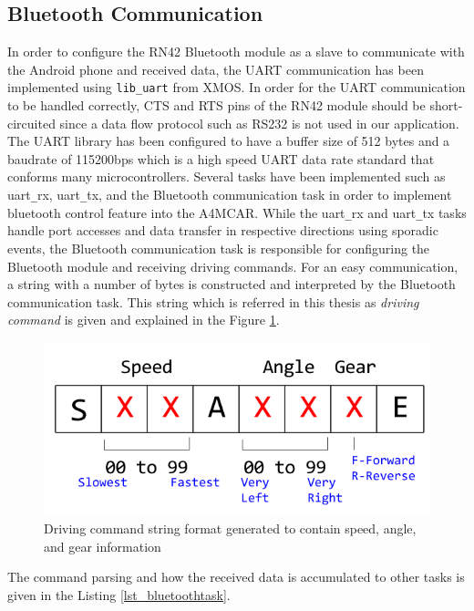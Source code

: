 \subsection{Bluetooth Communication}
In order to configure the RN42 Bluetooth module \cite{rn42datasheet} as a slave to communicate with the Android phone and received data, the UART communication has been implemented using \texttt{lib\texttt{\_}uart} from XMOS. In order for the UART communication to be handled correctly, CTS and RTS pins of the RN42 module should be short-circuited since a data flow protocol such as RS232 is not used in our application. The UART library has been configured to have a buffer size of 512 bytes and a baudrate of 115200bps which is a high speed UART data rate standard that conforms many microcontrollers. Several tasks have been implemented such as uart\texttt{\_}rx, uart\texttt{\_}tx, and the Bluetooth communication task in order to implement bluetooth control feature into the A4MCAR. While the uart\texttt{\_}rx and uart\texttt{\_}tx tasks handle port accesses and data transfer in respective directions using sporadic events, the Bluetooth communication task is responsible for configuring the Bluetooth module and receiving driving commands. For an easy communication, a string with a number of bytes is constructed and interpreted by the Bluetooth communication task. This string which is referred in this thesis as \textit{driving command} is given and explained in the Figure \ref{fig:bluetoothcommand}. 
\begin{figure}[!ht]
	\centering
	\captionsetup{justification=centering}
	\includegraphics[scale=0.6]{content/images/bluetoothcommand.png}
	\caption{Driving command string format generated to contain speed, angle, and gear information}
	\label{fig:bluetoothcommand}
\end{figure}
The command parsing and how the received data is accumulated to other tasks is given in the Listing \ref{lst_bluetoothtask}. 

